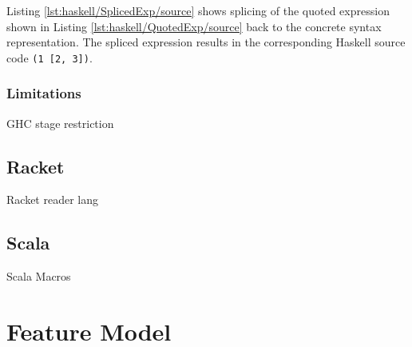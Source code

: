 Listing \ref{lst:haskell/SplicedExp/source} shows splicing of the quoted expression shown in Listing \ref{lst:haskell/QuotedExp/source} back to the concrete syntax representation.
The spliced expression results in the corresponding Haskell source code \lstinline{(1 [2, 3])}.



\subsubsection{Limitations}

GHC stage restriction

\subsection{Racket}

Racket reader lang

\subsection{Scala}

Scala Macros

\section{Feature Model}


